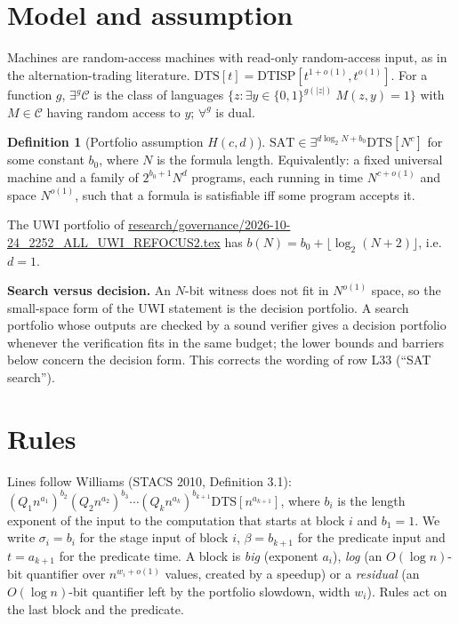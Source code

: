 \documentclass[11pt]{article}
\theoremstyle{definition}
\newtheorem{definition}[theorem]{Definition}
\theoremstyle{remark}
\newcommand{\DTS}{\mathrm{DTS}}
\newcommand{\DTISP}{\mathrm{DTISP}}
\newcommand{\SAT}{\mathrm{SAT}}
\begin{document}
\section{Model and assumption}

Machines are random-access machines with read-only random-access input, as in the alternation-trading
literature. $\DTS[t]=\DTISP[t^{1+o(1)},t^{o(1)}]$. For a function $g$,
$\exists^{g}\mathcal C$ is the class of languages $\{z:\exists y\in\{0,1\}^{g(|z|)}\ M(z,y)=1\}$ with
$M\in\mathcal C$ having random access to $y$; $\forall^g$ is dual.

\begin{definition}[Portfolio assumption $H(c,d)$]
$\SAT\in\exists^{d\log_2 N+b_0}\DTS[N^c]$ for some constant $b_0$, where $N$ is the formula length.
Equivalently: a fixed universal machine and a family of $2^{b_0+1}N^d$ programs, each running in time
$N^{c+o(1)}$ and space $N^{o(1)}$, such that a formula is satisfiable iff some program accepts it.
\end{definition}

\noindent The UWI portfolio of \url{research/governance/2026-10-24_2252_ALL_UWI_REFOCUS2.tex} has
$b(N)=b_0+\lfloor\log_2(N+2)\rfloor$, i.e.\ $d=1$.

\noindent\textbf{Search versus decision.} An $N$-bit witness does not fit in $N^{o(1)}$ space, so the
small-space form of the UWI statement is the decision portfolio. A search portfolio whose outputs are
checked by a sound verifier gives a decision portfolio whenever the verification fits in the same
budget; the lower bounds and barriers below concern the decision form. This corrects the wording of
row L33 (``SAT search'').

\section{Rules}

Lines follow Williams (STACS 2010, Definition 3.1):
$(Q_1n^{a_1})^{b_2}(Q_2n^{a_2})^{b_3}\cdots(Q_kn^{a_k})^{b_{k+1}}\DTS[n^{a_{k+1}}]$, where $b_i$ is the
length exponent of the input to the computation that starts at block $i$ and $b_1=1$. We write $\sigma_i=b_i$
for the stage input of block $i$, $\beta=b_{k+1}$ for the predicate input and $t=a_{k+1}$ for the
predicate time. A block is \emph{big} (exponent $a_i$), \emph{log} (an $O(\log n)$-bit quantifier over
$n^{w_i+o(1)}$ values, created by a speedup) or a \emph{residual} (an $O(\log n)$-bit quantifier left by
the portfolio slowdown, width $w_i$). Rules act on the last block and the predicate.
\end{document}
